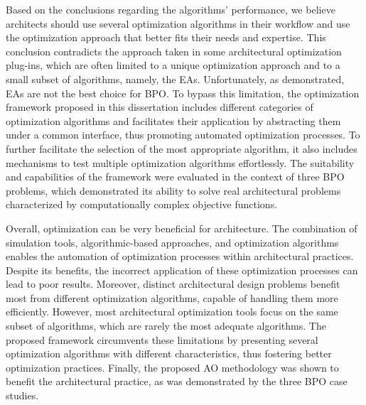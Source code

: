 Based on the conclusions regarding the algorithms' performance, we believe architects should use several optimization algorithms in their workflow and use the optimization approach that better fits their needs and expertise. This conclusion contradicts the approach taken in some architectural optimization plug-ins, which are often limited to a unique optimization approach and to a small subset of algorithms, namely, the \acp{EA}. Unfortunately, as demonstrated, \acp{EA} are not the best choice for \ac{BPO}. To bypass this limitation, the optimization framework proposed in this dissertation includes different categories of optimization algorithms and facilitates their application by abstracting them under a common interface, thus promoting automated optimization processes. To further facilitate the selection of the most appropriate algorithm, it also includes mechanisms to test multiple optimization algorithms effortlessly. The suitability and capabilities of the framework were evaluated in the context of three \ac{BPO} problems, which demonstrated its ability to solve real architectural problems characterized by computationally complex objective functions.

Overall, optimization can be very beneficial for architecture. The combination of simulation tools, algorithmic-based approaches, and optimization algorithms enables the automation of optimization processes within architectural practices. Despite its benefits, the incorrect application of these optimization processes can lead to poor results. Moreover, distinct architectural design problems benefit most from different optimization algorithms, capable of handling them more efficiently. However, most architectural optimization tools focus on the same subset of algorithms, which are rarely the most adequate algorithms. The proposed framework circumvents these limitations by presenting several optimization algorithms with different characteristics, thus fostering better optimization practices. Finally, the proposed \ac{AO} methodology was shown to benefit the architectural practice, as was demonstrated by the three \ac{BPO} case studies.